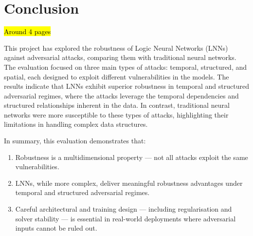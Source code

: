 \chapter{Conclusion}

\hl{Around 4 pages}

This project has explored the robustness of Logic Neural Networks (LNNs) against adversarial attacks, comparing them with traditional neural networks. The evaluation focused on three main types of attacks: temporal, structured, and spatial, each designed to exploit different vulnerabilities in the models.
The results indicate that LNNs exhibit superior robustness in temporal and structured adversarial regimes, where the attacks leverage the temporal dependencies and structured relationships inherent in the data. In contrast, traditional neural networks were more susceptible to these types of attacks, highlighting their limitations in handling complex data structures.


In summary, this evaluation demonstrates that:
\begin{enumerate}
    \item Robustness is a multidimensional property — not all attacks exploit the same vulnerabilities.
    \item LNNs, while more complex, deliver meaningful robustness advantages under temporal and structured adversarial regimes.
    \item Careful architectural and training design — including regularisation and solver stability — is essential in real-world deployments where adversarial inputs cannot be ruled out.
\end{enumerate}
